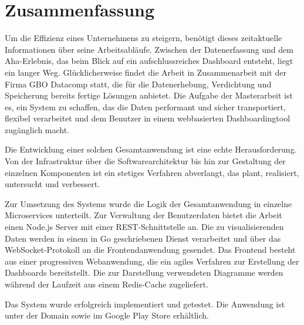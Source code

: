 \chapter*{Zusammenfassung}
\label{chap:zusammenfassung}

Um die Effizienz eines Unternehmens zu steigern, benötigt dieses zeitaktuelle Informationen über seine Arbeitsabläufe.
Zwischen der Datenerfassung und dem Aha-Erlebnis, das beim Blick auf ein aufschlussreiches Dashboard entsteht, liegt ein
langer Weg. Glücklicherweise findet die Arbeit in Zusammenarbeit mit der Firma GBO Datacomp statt, die für die
Datenerhebung, Verdichtung und Speicherung bereits fertige Lösungen anbietet. Die Aufgabe der Masterarbeit
ist es, ein System zu schaffen, das die Daten performant und sicher transportiert, flexibel verarbeitet und dem Benutzer
in einem webbasierten Dashboardingtool zugänglich macht.

Die Entwicklung einer solchen Gesamtanwendung ist eine echte Herausforderung. Von der Infrastruktur
über die Softwarearchitektur bis hin zur Gestaltung der einzelnen Komponenten ist ein stetiges
Verfahren abverlangt, das plant, realisiert, untersucht und verbessert.

Zur Umsetzung des Systems wurde die Logik der Gesamtanwendung in einzelne Microservices
unterteilt. Zur Verwaltung der Benutzerdaten bietet die Arbeit einen Node.js Server
mit einer REST-Schnittstelle an. Die zu visualisierenden Daten werden in einem
in Go geschriebenen Dienst verarbeitet und über das WebSocket-Protokoll an die
Frontendanwendung gesendet. Das Frontend besteht aus einer progressiven Webanwendung,
die ein agiles Verfahren zur Erstellung der Dashboards bereitstellt. Die zur Darstellung
verwendeten Diagramme werden während der Laufzeit aus einem Redis-Cache zugeliefert.

Das System wurde erfolgreich implementiert und getestet. Die Anwendung ist unter der Domain 
sowie im Google Play Store erhältlich.
